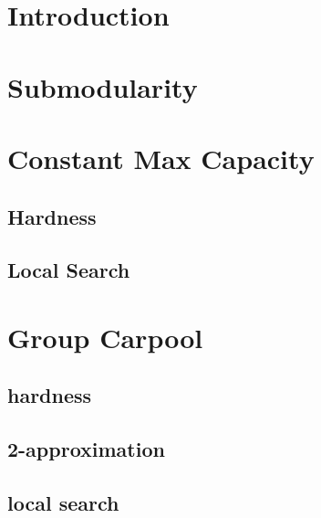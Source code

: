 \begin{abstract}

\end{abstract}

\section{Introduction}


\section{Submodularity}
\label{sec:sub}


\section{Constant Max Capacity}
	
	\subsection{Hardness}
	\label{sec:hardness}
	
	
	\subsection{Local Search}
	\label{sec:local}
	

\section{Group Carpool}
\label{sec:group}

	
	\subsection{hardness}
	
	
	\subsection{2-approximation}
	
	
	\subsection{local search}
	
